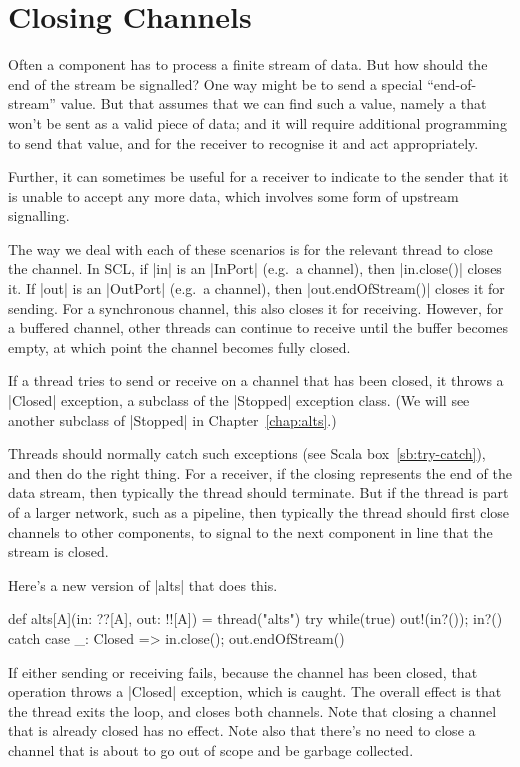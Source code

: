 \section{Closing Channels}

Often a component has to process a finite stream of data.  But how should the
end of the stream be signalled?  One way might be to send a special
``end-of-stream'' value.  But that assumes that we can find such a value,
namely a that won't be sent as a valid piece of data; and it will require
additional programming to send that value, and for the receiver to recognise
it and act appropriately.

Further, it can sometimes be useful for a receiver to indicate to the sender
that it is unable to accept any more data, which involves some form of
upstream signalling.

The way we deal with each of these scenarios is for the relevant thread to
close the channel. 
%
In SCL, if |in| is an |InPort| (e.g.~a channel), then |in.close()| closes it.
%
If |out| is an |OutPort| (e.g.~a channel), then |out.endOfStream()| closes it
for sending.  For a synchronous channel, this also closes it for receiving.
However, for a buffered channel, other threads can continue to receive until
the buffer becomes empty, at which point the channel becomes fully closed.


If a thread tries to send or receive on a channel that has been closed, it
throws a |Closed| exception, a subclass of the |Stopped| exception class.
(We will see another subclass of |Stopped| in Chapter~\ref{chap:alts}.)

Threads should normally catch such exceptions (see Scala
box~\ref{sb:try-catch}), and then do the right thing.  For a receiver, if the
closing represents the end of the data stream, then typically the thread
should terminate.  But if the thread is part of a larger network, such as a
pipeline, then typically the thread should first close channels to other
components, to signal to the next component in line that the stream is closed.


\pagebreak[3]

Here's a new version of |alts| that does this.
%
\begin{mysamepage}
\begin{scala}
  def alts[A](in: ??[A], out: !![A]) = thread("alts"){ 
    try{ while(true){ out!(in?()); in?() } } 
    catch{ case _: Closed => in.close(); out.endOfStream() }
  }
\end{scala}
\end{mysamepage}
% 
If either sending or receiving fails, because the channel has been closed,
that operation throws a |Closed| exception, which is caught.  The overall
effect is that the thread exits the loop, and closes both channels.  
%
Note that closing a channel that is already closed has no effect.
Note also that there's no need to close a channel that is about to go out of
scope and be garbage collected. 

